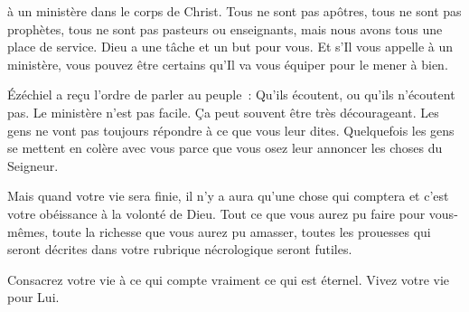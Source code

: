 

 à un ministère
 dans le corps de Christ. Tous ne sont pas apôtres,
 tous ne sont pas prophètes, tous ne sont pas pasteurs ou enseignants,
 mais nous avons tous une place de service.
 Dieu a une tâche et un but pour vous.
 Et s'Il vous appelle à un ministère, vous pouvez être certains
 qu'Il va vous équiper pour le mener à bien. 


Ézéchiel a reçu l'ordre de parler au peuple~: 
 \og Qu'ils écoutent, ou qu'ils n'écoutent pas. \fg{}
 Le ministère n'est pas facile. Ça peut souvent être très décourageant.
 Les gens ne vont pas toujours répondre à ce que vous leur dites.
 Quelquefois les gens se mettent en colère avec vous parce que vous osez
 leur annoncer les choses du Seigneur. 

Mais quand votre vie sera finie, il n'y a aura qu'une chose qui comptera 
 \ocadr et c'est votre obéissance à la volonté de Dieu.
 Tout ce que vous aurez pu faire pour vous-mêmes, toute la richesse
 que vous aurez pu amasser, toutes les prouesses qui seront décrites
 dans votre rubrique nécrologique seront futiles. 

Consacrez votre vie à ce qui compte vraiment
 \ocadr ce qui est éternel. Vivez votre vie pour Lui. 

\dvrule


